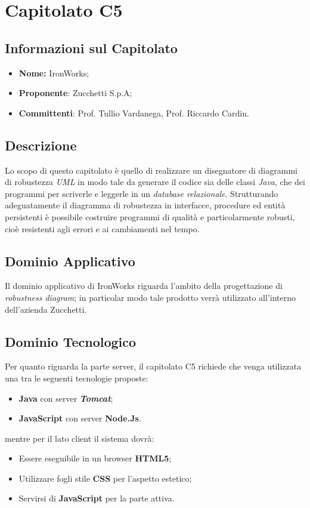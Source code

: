 \section{Capitolato C5}
\subsection{Informazioni sul Capitolato}
	\begin{itemize}
		\item \textbf{Nome:}
		IronWorks;
		\item \textbf{Proponente}:
		Zucchetti S.p.A;
		\item \textbf{Committenti}:
		Prof. Tullio Vardanega, Prof. Riccardo Cardin.
	\end{itemize}

\subsection{Descrizione}
	Lo scopo di questo capitolato è quello di realizzare un disegnatore di diagrammi di robustezza \textit{UML} in modo tale da generare il codice sia delle classi \textit{Java}, che dei programmi per scriverle e leggerle in un \textit{database relazionale}.
	\newline \newline Strutturando adeguatamente il diagramma di robustezza in interfacce, procedure ed entità persistenti è possibile costruire programmi di qualità e particolarmente robusti, cioè resistenti agli errori e ai cambiamenti nel tempo.
	
\subsection{Dominio Applicativo}
	Il dominio applicativo di IronWorks riguarda l'ambito della progettazione di \textit{robustness diagram}; in particolar modo tale prodotto verrà utilizzato all'interno dell'azienda Zucchetti.
	
\subsection{Dominio Tecnologico}
	Per quanto riguarda la parte server, il capitolato C5 richiede che venga utilizzata una tra le seguenti tecnologie proposte:
	\begin{itemize}
		\item \textbf{Java} con server \textit{\textbf{Tomcat}};
		\item \textbf{JavaScript} con server \textbf{Node.Js}.
	\end{itemize}
	mentre per il lato client il sistema dovrà:
	\begin{itemize}
		\item Essere eseguibile in un browser \textbf{HTML5};
		\item Utilizzare fogli stile \textbf{CSS} per l’aspetto estetico;
		\item Servirsi di \textbf{JavaScript} per la parte attiva.
	\end{itemize}
	
